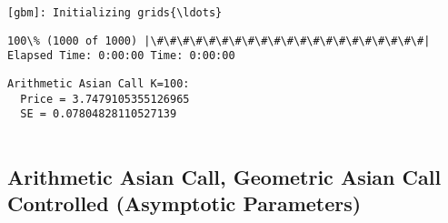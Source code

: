 \documentclass[11pt]{article}
\begin{document}
    \begin{Verbatim}[commandchars=\\\{\}]
[gbm]: Initializing grids{\ldots}

    \end{Verbatim}

    \begin{Verbatim}[commandchars=\\\{\}]
100\% (1000 of 1000) |\#\#\#\#\#\#\#\#\#\#\#\#\#\#\#\#\#\#\#\#\#| Elapsed Time: 0:00:00 Time: 0:00:00

    \end{Verbatim}

    \begin{Verbatim}[commandchars=\\\{\}]
Arithmetic Asian Call K=100:
  Price = 3.7479105355126965
  SE = 0.07804828110527139


    \end{Verbatim}

    \subsection{Arithmetic Asian Call, Geometric Asian Call Controlled
(Asymptotic
Parameters)}\label{arithmetic-asian-call-geometric-asian-call-controlled-asymptotic-parameters}
\end{document}

